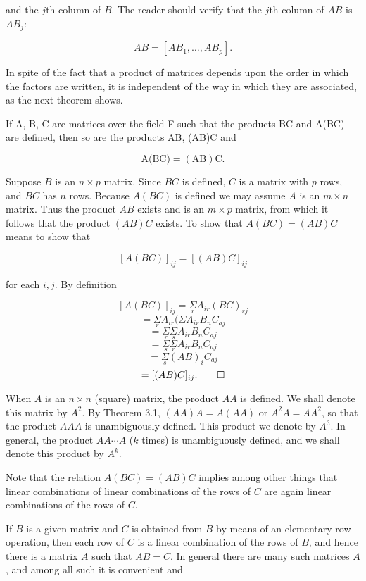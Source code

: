 and the \(j\)th column of \(B\). The reader should verify that the \(j\)th column of \(AB\) is \(AB_{j}\):

\[AB=[AB_{1},\ldots,AB_{p}].\]

In spite of the fact that a product of matrices depends upon the order in which the factors are written, it is independent of the way in which they are associated, as the next theorem shows.

If A, B, C are matrices over the field F such that the products BC and A(BC) are defined, then so are the products AB, (AB)C and

\[\text{A(BC)}=(\text{AB})\text{C}.\]

Suppose \(B\) is an \(n\times p\) matrix. Since \(BC\) is defined, \(C\) is a matrix with \(p\) rows, and \(BC\) has \(n\) rows. Because \(A(BC)\) is defined we may assume \(A\) is an \(m\times n\) matrix. Thus the product \(AB\) exists and is an \(m\times p\) matrix, from which it follows that the product \((AB)C\) exists. To show that \(A(BC)=(AB)C\) means to show that

\[[A(BC)]_{ij}=[(AB)C]_{ij}\]

for each \(i,j\). By definition

\[[A(BC)]_{ij} =\underset{r}{\Sigma}A_{ir}(BC)_{rj}\] \[=\underset{r}{\Sigma}A_{ir}({\Sigma}A_{ir}B_{n}C_{aj}\] \[=\underset{r}{\Sigma}\underset{s}{\Sigma}A_{ir}B_{n}C_{aj}\] \[=\underset{s}{\Sigma}\underset{r}{\Sigma}A_{ir}B_{n}C_{aj}\] \[=\underset{s}{\Sigma}(AB)_{i}C_{aj}\] \[=[(AB)C]_{ij}.\qed\]

When \(A\) is an \(n\times n\) (square) matrix, the product \(AA\) is defined. We shall denote this matrix by \(A^{2}\). By Theorem 3.1, \((AA)A=A(AA)\) or \(A^{2}A=AA^{2}\), so that the product \(AAA\) is unambiguously defined. This product we denote by \(A^{3}\). In general, the product \(AA\)\(\cdots A\) (\(k\) times) is unambiguously defined, and we shall denote this product by \(A^{k}\).

Note that the relation \(A(BC)=(AB)C\) implies among other things that linear combinations of linear combinations of the rows of \(C\) are again linear combinations of the rows of \(C\).

If \(B\) is a given matrix and \(C\) is obtained from \(B\) by means of an elementary row operation, then each row of \(C\) is a linear combination of the rows of \(B\), and hence there is a matrix \(A\) such that \(AB=C\). In general there are many such matrices \(A\), and among all such it is convenient and 